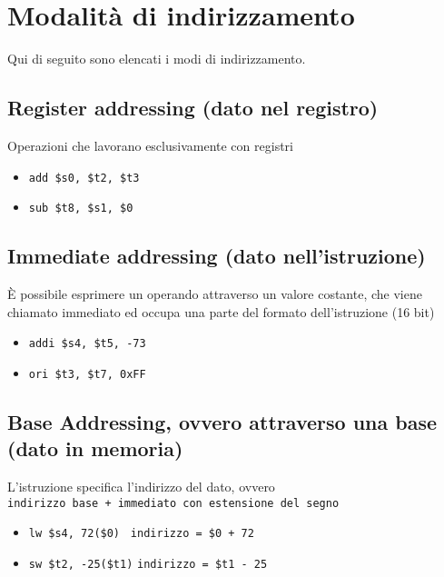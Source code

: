 \documentclass[../main.tex]{subfiles}
\begin{document}
    \chapter{Modalità di indirizzamento}
    Qui di seguito sono elencati i modi di indirizzamento.
    \section{Register addressing (dato nel registro)}
    Operazioni che lavorano esclusivamente con registri
    \begin{itemize}
        \item \texttt{add \$s0, \$t2, \$t3}
        \item \texttt{sub \$t8, \$s1, \$0}
    \end{itemize}
    \section{Immediate addressing (dato nell'istruzione)}
    È possibile esprimere un operando attraverso un valore costante,
    che viene chiamato immediato ed occupa una parte del formato
    dell'istruzione (16 bit)
    \begin{itemize}
        \item \texttt{addi \$s4, \$t5, -73}
        \item \texttt{ori \$t3, \$t7, 0xFF}
    \end{itemize}
    \section{Base Addressing, ovvero attraverso una base (dato in memoria)}
    L'istruzione specifica l'indirizzo del dato, ovvero \\
    \texttt{indirizzo base + immediato con estensione del segno}
    \begin{itemize}
        \item \texttt{lw \$s4, 72(\$0) \hspace*{0cm} \hspace*{0cm}} \hspace*{1cm} \texttt{indirizzo = \$0 + 72}
        \item \texttt{sw \$t2, -25(\$t1)} \hspace*{1cm} \texttt{indirizzo = \$t1 - 25}
    \end{itemize}
\end{document}
